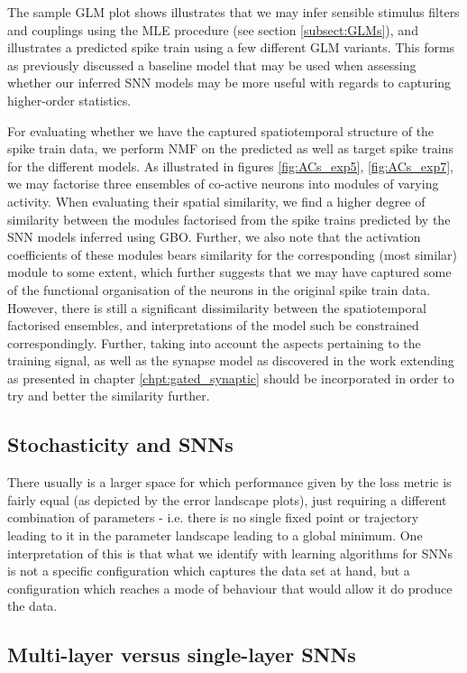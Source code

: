 \documentclass[mphil,deptreport,ianc]{infthesis} %
\begin{document}
The sample GLM plot shows illustrates that we may infer sensible stimulus filters and couplings using the MLE procedure (see section \ref{subsect:GLMs}), and illustrates a predicted spike train using a few different GLM variants.
This forms as previously discussed a baseline model that may be used when assessing whether our inferred SNN models may be more useful with regards to capturing higher-order statistics.

For evaluating whether we have the captured spatiotemporal structure of the spike train data, we perform NMF on the predicted as well as target spike trains for the different models.
As illustrated in figures \ref{fig:ACs_exp5}, \ref{fig:ACs_exp7}, we may factorise three ensembles of co-active neurons into modules of varying activity.
When evaluating their spatial similarity, we find a higher degree of similarity between the modules factorised from the spike trains predicted by the SNN models inferred using GBO.
Further, we also note that the activation coefficients of these modules bears similarity for the corresponding (most similar) module to some extent, which further suggests that we may have captured some of the functional organisation of the neurons in the original spike train data.
However, there is still a significant dissimilarity between the spatiotemporal factorised ensembles, and interpretations of the model such be constrained correspondingly.
Further, taking into account the aspects pertaining to the training signal, as well as the synapse model as discovered in the work extending \cite{Huh2018} as presented in chapter \ref{chpt:gated_synaptic} should be incorporated in order to try and better the similarity further.


\subsection*{Stochasticity and SNNs}

There usually is a larger space for which performance given by the loss metric is fairly equal (as depicted by the error landscape plots), just requiring a different combination of parameters - i.e. there is no single fixed point or trajectory leading to it in the parameter landscape leading to a global minimum.
One interpretation of this is that what we identify with learning algorithms for SNNs is not a specific configuration which captures the data set at hand, but a configuration which reaches a mode of behaviour that would allow it do produce the data.

\subsection*{Multi-layer versus single-layer SNNs}
\end{document}
